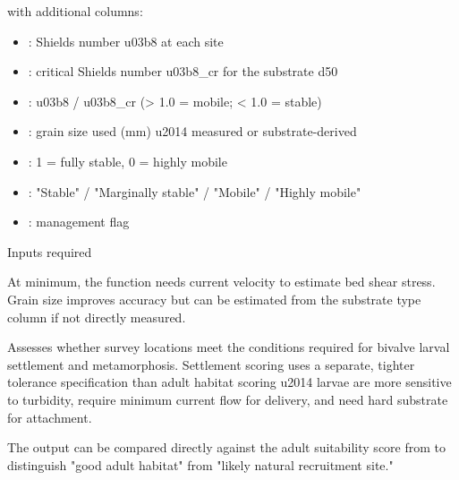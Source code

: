 \documentclass[a4paper]{book}
\begin{document}
%
\begin{Value}
 with additional columns:
\begin{itemize}

\item{} : Shields number \bsl{}u03b8 at each site
\item{} : critical Shields number \bsl{}u03b8\_cr for the substrate d50
\item{} : \bsl{}u03b8 / \bsl{}u03b8\_cr (> 1.0 = mobile; < 1.0 = stable)
\item{} : grain size used (mm) \bsl{}u2014 measured or substrate-derived
\item{}  : 1 = fully stable, 0 = highly mobile
\item{} : "Stable" / "Marginally stable" / "Mobile" / "Highly mobile"
\item{} : management flag

\end{itemize}

\end{Value}
%
\begin{Section}{Inputs required}

At minimum, the function needs current velocity to estimate bed shear
stress. Grain size improves accuracy but can be estimated from the
substrate type column if not directly measured.
\end{Section}
%
\begin{Examples}
\end{Examples}
%
\begin{Description}
Assesses whether survey locations meet the conditions required for bivalve
larval settlement and metamorphosis. Settlement scoring uses a separate,
tighter tolerance specification than adult habitat scoring \bsl{}u2014 larvae are more
sensitive to turbidity, require minimum current flow for delivery, and need
hard substrate for attachment.

The output can be compared directly against the adult suitability score from
 to distinguish "good adult habitat" from "likely natural
recruitment site."
\end{Description}
\end{document}
